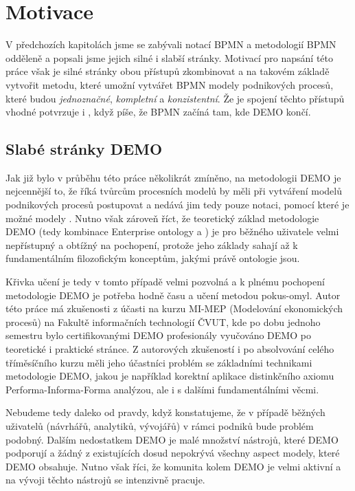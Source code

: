 \section{Motivace} \label{sec:motivace}
V předchozích kapitolách jsme se zabývali notací BPMN a metodologií BPMN odděleně a popsali jsme jejich silné i slabší stránky. Motivací pro napsání této práce však je silné stránky obou přístupů zkombinovat a na takovém základě vytvořit metodu, které umožní vytvářet BPMN modely podnikových procesů, které budou \textit{jednoznačné},  \textit{kompletní} a \textit{konzistentní}. Že je spojení těchto přístupů vhodné potvrzuje i \cite{VanNuffel2009}, když píše, že BPMN začíná tam, kde DEMO končí.

\subsection{Slabé stránky DEMO}
Jak již bylo v průběhu této práce několikrát zmíněno, na metodologii DEMO je nejcennější to, že říká tvůrcům procesních modelů  by měli při vytváření modelů podnikových procesů postupovat a nedává jim tedy pouze notaci, pomocí které je možné modely . Nutno však zároveň říct, že teoretický základ metodologie DEMO (tedy kombinace Enterprise ontology a \ptheory{}) je pro běžného uživatele velmi nepřístupný a obtížný na pochopení, protože jeho základy sahají až k fundamentálním filozofickým konceptům, jakými právě ontologie jsou. 

Křivka učení je tedy v tomto případě velmi pozvolná a k plnému pochopení metodologie DEMO je potřeba hodně času a učení metodou pokus-omyl. Autor této práce má zkušenosti z účasti na kurzu MI-MEP (Modelování ekonomických procesů) na Fakultě informačních technologií ČVUT, kde po dobu jednoho semestru bylo certifikovanými DEMO profesionály vyučováno DEMO po teoretické i praktické stránce. Z autorových zkušeností i po absolvování celého tříměsíčního kurzu měli jeho účastníci problém se základními technikami metodologie DEMO, jakou je například korektní aplikace distinkčního axiomu Performa-Informa-Forma analýzou, ale i s dalšími fundamentálními věcmi.

Nebudeme tedy daleko od pravdy, když konstatujeme, že v případě běžných uživatelů (návrhářů, analytiků, vývojářů) v rámci podniků bude problém podobný. Dalším nedostatkem DEMO je malé množství nástrojů, které DEMO podporují a žádný z existujících dosud nepokrývá všechny aspect modely, které DEMO obsahuje. Nutno však říci, že komunita kolem DEMO je velmi aktivní a na vývoji těchto nástrojů se intenzivně pracuje.

